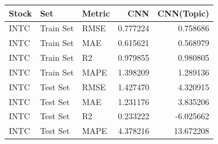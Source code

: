 \begin{tabular}{lllrr}
\toprule
Stock & Set & Metric & CNN & CNN(Topic) \\
\midrule
INTC & Train Set & RMSE & 0.777224 & 0.758686 \\
INTC & Train Set & MAE & 0.615621 & 0.568979 \\
INTC & Train Set & R2 & 0.979855 & 0.980805 \\
INTC & Train Set & MAPE & 1.398209 & 1.289136 \\
INTC & Test Set & RMSE & 1.427470 & 4.320915 \\
INTC & Test Set & MAE & 1.231176 & 3.835206 \\
INTC & Test Set & R2 & 0.233222 & -6.025662 \\
INTC & Test Set & MAPE & 4.378216 & 13.672208 \\
\bottomrule
\end{tabular}
